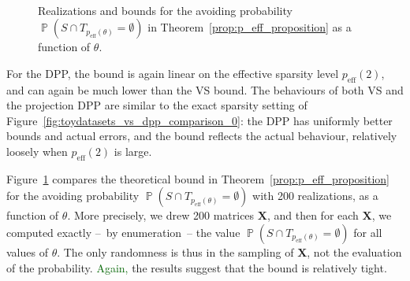 \documentclass[twoside,11pt]{book}
\newcommand{\rev}[1]{\textcolor{darkgreen}{#1}}
\numberwithin{theorem}{chapter}
\numberwithin{definition}{chapter}
\numberwithin{proposition}{chapter}
\numberwithin{corollary}{chapter}
\numberwithin{example}{chapter}
\numberwithin{lemma}{chapter}
\DeclareMathOperator{\eff}{\mathrm{eff}}
\DeclareMathOperator{\Prb}{\mathbb{P}}
\begin{document}
\begin{figure}
    \centering
{}
\\

\caption{Realizations and bounds for the avoiding probability $\Prb(S \cap T_{p_{\mathrm{eff}}(\theta)} = \emptyset)$ in Theorem~\ref{prop:p_eff_proposition} as a function of $\theta$.
\label{fig:toydatasets_avoiding_proba}}
\end{figure}

For the DPP, the bound is again linear on the effective sparsity level $p_{\mathrm{eff}}(2)$, and can again be much lower than the VS bound. The behaviours of both VS and the projection DPP are similar to the exact sparsity setting of Figure~\ref{fig:toydatasets_vs_dpp_comparison_0}: the DPP has uniformly better bounds and actual errors, and the bound reflects the actual behaviour, relatively loosely when $p_{\eff}(2)$ is large.

Figure~\ref{fig:toydatasets_avoiding_proba} compares the theoretical bound in Theorem~\ref{prop:p_eff_proposition} for the avoiding probability $\Prb(S \cap T_{p_{\mathrm{eff}}(\theta)} = \emptyset)$ with 200 realizations, as a function of $\theta$. More precisely, we drew 200 matrices $\bm{X}$, and then for each $\bm{X}$, we computed exactly --~by enumeration~-- the value $\Prb(S \cap T_{p_{\mathrm{eff}}(\theta)} = \emptyset)$ for all values of $\theta$. The only randomness is thus in the sampling of $\bm{X}$, not the evaluation of the probability. \rev{Again, } the results suggest that the bound is relatively tight.
\end{document}
